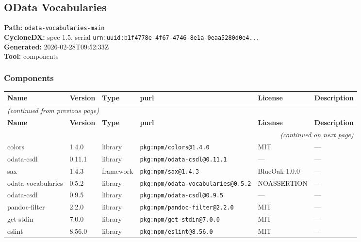 \documentclass[11pt,a4paper]{article}
\begin{document}
\subsection{OData Vocabularies}
\textbf{Path:} \texttt{odata-vocabularies-main}
\\ \textbf{CycloneDX:} spec 1.5, serial \texttt{urn:uuid:b1f4778e-4f67-4746-8e1a-0eaa5280d0e4...}
\\ \textbf{Generated:} 2026-02-28T09:52:33Z
\\ \textbf{Tool:} components

\subsubsection*{Components}
\begin{longtable}{|p{4cm}|p{2cm}|p{1.6cm}|p{5cm}|p{1.5cm}|p{3.5cm}|}
\toprule
\rowcolor{sbomhdr}\textbf{Name} & \textbf{Version} & \textbf{Type} & \textbf{purl} & \textbf{License} & \textbf{Description} \\
\midrule
\endfirsthead
\multicolumn{6}{l}{\small\itshape (continued from previous page)} \\
\toprule
\rowcolor{sbomhdr}\textbf{Name} & \textbf{Version} & \textbf{Type} & \textbf{purl} & \textbf{License} & \textbf{Description} \\
\midrule
\endhead
\midrule
\multicolumn{6}{r}{\small\itshape (continued on next page)} \\
\endfoot
\bottomrule
\endlastfoot
\raggedright colors & 1.4.0 & library & \small\texttt{pkg:npm/colors@1.4.0} & MIT & \small — \\
\raggedright odata-csdl & 0.11.1 & library & \small\texttt{pkg:npm/odata-csdl@0.11.1} & — & \small — \\
\raggedright sax & 1.4.3 & framework & \small\texttt{pkg:npm/sax@1.4.3} & BlueOak-1.0.0 & \small — \\
\raggedright odata-vocabularies & 0.5.2 & library & \small\texttt{pkg:npm/odata-vocabularies@0.5.2} & NOASSERTION & \small — \\
\raggedright odata-csdl & 0.9.5 & library & \small\texttt{pkg:npm/odata-csdl@0.9.5} & — & \small — \\
\raggedright pandoc-filter & 2.2.0 & library & \small\texttt{pkg:npm/pandoc-filter@2.2.0} & MIT & \small — \\
\raggedright get-stdin & 7.0.0 & library & \small\texttt{pkg:npm/get-stdin@7.0.0} & MIT & \small — \\
\raggedright eslint & 8.56.0 & library & \small\texttt{pkg:npm/eslint@8.56.0} & MIT & \small — \\

\end{longtable}
\end{document}
